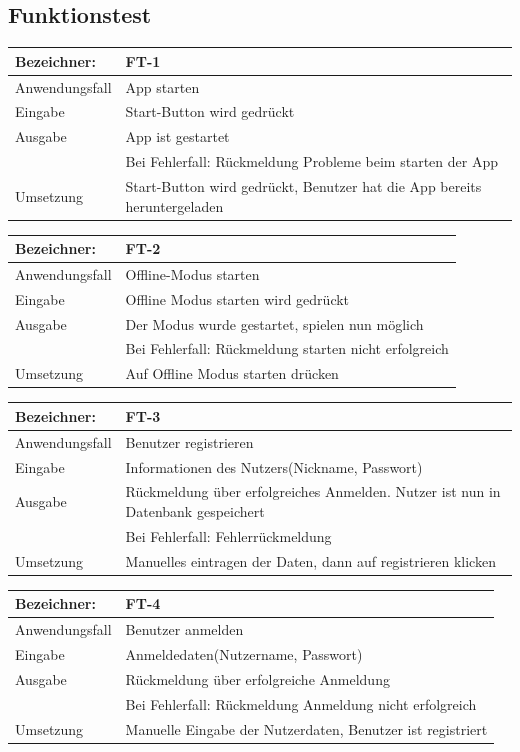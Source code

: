 \documentclass[fontsize=12pt,paper=a4,twoside]{scrartcl}
\begin{document}
\subsection{Funktionstest}\label{c10b}

\begin{tabular}{|l|p{13.75cm}|}
\hline
	Bezeichner: & FT-1\\
\hline
	Anwendungsfall & App starten\\
\hline
	Eingabe & Start-Button wird gedrückt\\
\hline
	Ausgabe & App ist gestartet\\ &
	Bei Fehlerfall: Rückmeldung Probleme beim starten der App\\
\hline
	Umsetzung & Start-Button wird gedrückt, Benutzer hat die App bereits heruntergeladen\\
\hline
\end{tabular}

\begin{tabular}{|l|p{13.75cm}|}
\hline
	Bezeichner: & FT-2\\
\hline
	Anwendungsfall & Offline-Modus starten\\
\hline
	Eingabe & Offline Modus starten wird gedrückt\\
\hline
	Ausgabe & Der Modus wurde gestartet, spielen nun möglich\\ &
	Bei Fehlerfall: Rückmeldung starten nicht erfolgreich\\
\hline
	Umsetzung & Auf Offline Modus starten drücken\\
\hline
\end{tabular}

\begin{tabular}{|l|p{13.75cm}|}
\hline
	Bezeichner: & FT-3\\
\hline
	Anwendungsfall & Benutzer registrieren\\
\hline
	Eingabe & Informationen des Nutzers(Nickname, Passwort)\\ 
\hline
	Ausgabe & Rückmeldung über erfolgreiches Anmelden. Nutzer ist nun in Datenbank gespeichert\\ &
	Bei Fehlerfall: Fehlerrückmeldung\\
\hline
	Umsetzung & Manuelles eintragen der Daten, dann auf registrieren klicken\\
\hline
\end{tabular}

\begin{tabular}{|l|p{13.75cm}|}
\hline
	Bezeichner: & FT-4\\
\hline
	Anwendungsfall & Benutzer anmelden\\
\hline
	Eingabe & Anmeldedaten(Nutzername, Passwort)\\
\hline
	Ausgabe & Rückmeldung über erfolgreiche Anmeldung\\ &
	Bei Fehlerfall: Rückmeldung Anmeldung nicht erfolgreich\\
\hline
	Umsetzung & Manuelle Eingabe der Nutzerdaten, Benutzer ist registriert\\
\hline
\end{tabular}
\end{document}
